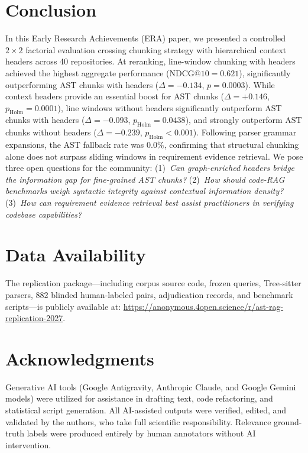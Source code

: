 \section{Conclusion}
\label{sec:conclusion}

In this Early Research Achievements (ERA) paper, we presented a controlled $2 \times 2$ factorial evaluation crossing chunking strategy with hierarchical context headers across 40 repositories. 
At reranking, line-window chunking with headers achieved the highest aggregate performance ($\text{NDCG@10} = 0.621$), significantly outperforming AST chunks with headers ($\Delta = -0.134$, $p = 0.0003$). 
While context headers provide an essential boost for AST chunks ($\Delta = +0.146$, $p_{\mathrm{Holm}} = 0.0001$), line windows without headers significantly outperform AST chunks with headers ($\Delta = -0.093$, $p_{\mathrm{Holm}} = 0.0438$), and strongly outperform AST chunks without headers ($\Delta = -0.239$, $p_{\mathrm{Holm}} < 0.001$). 
Following parser grammar expansions, the AST fallback rate was $0.0\%$, confirming that structural chunking alone does not surpass sliding windows in requirement evidence retrieval. 
We pose three open questions for the community:
(1)~\textit{Can graph-enriched headers bridge the information gap for fine-grained AST chunks?} 
(2)~\textit{How should code-RAG benchmarks weigh syntactic integrity against contextual information density?} 
(3)~\textit{How can requirement evidence retrieval best assist practitioners in verifying codebase capabilities?}

\section*{Data Availability}
The replication package---including corpus source code, frozen queries, Tree-sitter parsers, 882 blinded human-labeled pairs, adjudication records, and benchmark scripts---is publicly available at: \url{https://anonymous.4open.science/r/ast-rag-replication-2027}.

\section*{Acknowledgments}
Generative AI tools (Google Antigravity, Anthropic Claude, and Google Gemini models) were utilized for assistance in drafting text, code refactoring, and statistical script generation. 
All AI-assisted outputs were verified, edited, and validated by the authors, who take full scientific responsibility. 
Relevance ground-truth labels were produced entirely by human annotators without AI intervention.
